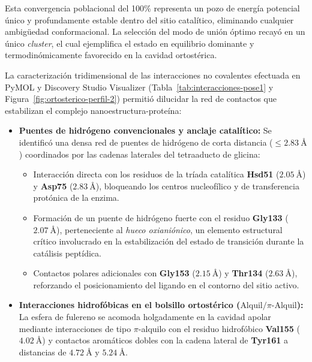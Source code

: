 Esta convergencia poblacional del 100\% representa un pozo de energía potencial único y profundamente estable dentro del sitio catalítico, eliminando cualquier ambigüedad conformacional. La selección del modo de unión óptimo recayó en un único \textit{cluster}, el cual ejemplifica el estado en equilibrio dominante y termodinómicamente favorecido en la cavidad ortostérica.


La caracterización tridimensional de las interacciones no covalentes efectuada en PyMOL y Discovery Studio Visualizer (Tabla~\ref{tab:interacciones-pose1} y Figura~\ref{fig:ortosterico-perfil-2}) permitió dilucidar la red de contactos que estabilizan el complejo nanoestructura-proteína:

\begin{itemize}
    \item \textbf{Puentes de hidrógeno convencionales y anclaje catalítico:} Se identificó una densa red de puentes de hidrógeno de corta distancia ($\le 2.83\ \text{\AA}$) coordinados por las cadenas laterales del tetraaducto de glicina:
    \begin{itemize}
        \item Interacción directa con los residuos de la tríada catalítica \textbf{Hsd51} ($2.05\ \text{\AA}$) y \textbf{Asp75} ($2.83\ \text{\AA}$), bloqueando los centros nucleofílico y de transferencia protónica de la enzima.
        \item Formación de un puente de hidrógeno fuerte con el residuo \textbf{Gly133} ($2.07\ \text{\AA}$), perteneciente al \textit{hueco oxianiónico}, un elemento estructural crítico involucrado en la estabilización del estado de transición durante la catálisis peptídica.
        \item Contactos polares adicionales con \textbf{Gly153} ($2.15\ \text{\AA}$) y \textbf{Thr134} ($2.63\ \text{\AA}$), reforzando el posicionamiento del ligando en el contorno del sitio activo.
    \end{itemize}
    
    \item \textbf{Interacciones hidrofóbicas en el bolsillo ortostérico ($\text{Alquil} / \pi\text{-Alquil}$):} La esfera de fulereno se acomoda holgadamente en la cavidad apolar mediante interacciones de tipo $\pi$-alquilo con el residuo hidrofóbico \textbf{Val155} ($4.02\ \text{\AA}$) y contactos aromáticos dobles con la cadena lateral de \textbf{Tyr161} a distancias de $4.72\ \text{\AA}$ y $5.24\ \text{\AA}$.
\end{itemize}

